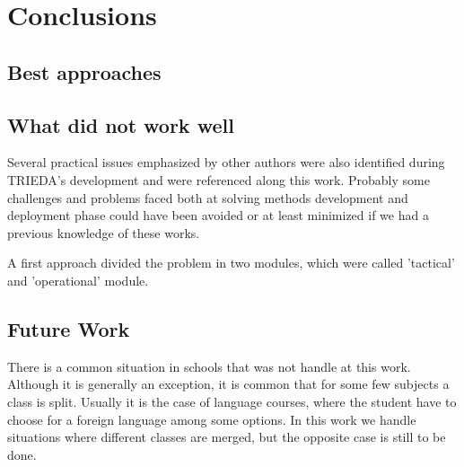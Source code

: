 \chapter{Conclusions}
\label{chap:conclusions}




\section{Best approaches}



\section{What did not work well}

Several practical issues emphasized by other authors were also identified during TRIEDA's development and were referenced along this work. Probably some challenges and problems faced both at solving methods development and deployment phase could have been avoided or at least minimized if we had a previous knowledge of these works.


A first approach divided the problem in two modules, which were called 'tactical' and 'operational' module.



\section{Future Work}

There is a common situation in schools that was not handle at this work. Although it is generally an exception, it is common that for some few subjects a class is split. Usually it is the case of language courses, where the student have to choose for a foreign language among some options. In this work we handle situations where different classes are merged, but the opposite case is still to be done.



